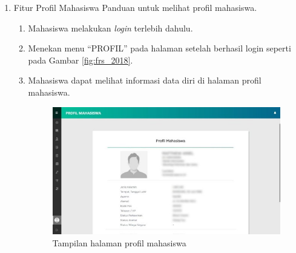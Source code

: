 \begin{enumerate}
	\item Fitur Profil Mahasiswa
	Panduan untuk melihat profil mahasiswa.
	 \begin{enumerate}
	 	\item Mahasiswa melakukan \textit{login} terlebih dahulu. 
	 	\item Menekan menu ``PROFIL'' pada halaman setelah berhasil login seperti pada Gambar \ref{fig:frs_2018}. 
	 	\item Mahasiswa dapat melihat informasi data diri di halaman profil mahasiswa.
	 	\begin{figure}[H]
	 		\centering
	 		\includegraphics[scale=0.7]{Gambar/profil2018.jpg}
	 		\caption{Tampilan halaman profil mahasiswa} 
	 		\label{fig:profil_2018}
	 	\end{figure}
 	\end{enumerate}
 

\end{enumerate}

